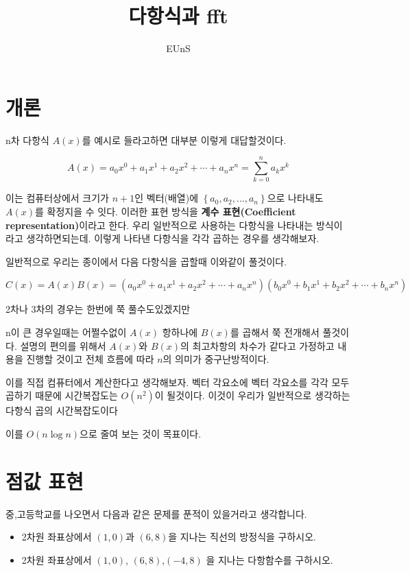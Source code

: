 \documentclass{oblivoir}
\title{다항식과 fft}
\author{EUnS}
\begin{document}
    

\maketitle

\tableofcontents


\section{개론}

n차 다항식 $A(x)$를 예시로 들라고하면 대부분 이렇게 대답할것이다.

$$A(x) = a_0x^0 + a_1x^1 + a_2x^2 + \cdots + a_{n}x^n = \sum_{k=0}^{n} a_kx^k$$

이는 컴퓨터상에서 크기가 $n+1$인 벡터(배열)에 $\left\{a_0,a_2, ... , a_n \right\}$으로 나타내도 $A(x)$를 확정지을 수 잇다. 이러한 표현 방식을 \textbf{계수 표현(Coefficient representation)}이라고 한다.
우리 일반적으로 사용하는 다항식을 나타내는 방식이라고 생각하면되는데. 
이렇게 나타낸 다항식을 각각 곱하는 경우를 생각해보자.

일반적으로 우리는 종이에서 다음 다항식을 곱할때 이와같이 풀것이다.

$C(x) = A(x)B(x) = (a_0x^0 + a_1x^1 + a_2x^2 + \cdots + a_nx^n)(b_0x^0 + b_1x^1 + b_2x^2 + \cdots + b_nx^n)$ 

2차나 3차의 경우는 한번에 쭉 풀수도있겠지만

n이 큰 경우일때는 어쩔수없이 $A(x)$ 항하나에 $B(x)$를 곱해서 쭉 전개해서 풀것이다. 설명의 편의를 위해서 $A(x)$와 $B(x)$의 최고차항의 차수가 같다고 가정하고 내용을 진행할 것이고 전체 흐름에 따라 $n$의 의미가 중구난방적이다.

이를 직접 컴퓨터에서 계산한다고 생각해보자.
벡터 각요소에 벡터 각요소를 각각 모두 곱하기 때문에 시간복잡도는 $O(n^2)$이 될것이다. 이것이 우리가 일반적으로 생각하는 다항식 곱의 시간복잡도이다

이를 $O(n \log n)$으로 줄여 보는 것이 목표이다.

\section{점값 표현}

중,고등학교를 나오면서 다음과 같은 문제를 푼적이 있을거라고 생각합니다.

\begin{framed}
    \begin{itemize}
        \item 2차원 좌표상에서 $(1,0)$과 $(6,8)$을 지나는 직선의 방정식을 구하시오.
        \item 2차원 좌표상에서 $(1,0)$, $(6,8)$,$(-4,8)$ 을 지나는 다항함수를 구하시오.
    \end{itemize}
\end{framed}
\end{document}

